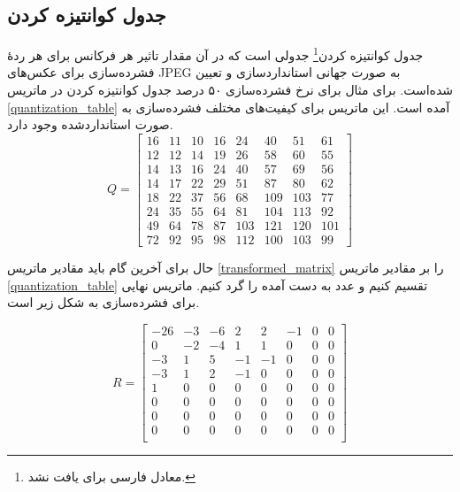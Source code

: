 \subsection{جدول کوانتیزه کردن}
جدول کوانتیزه کردن\footnote{معادل فارسی برای 
 یافت نشد.}
جدولی است که در آن مقدار تاثیر هر فرکانس برای هر ردهٔ فشرده‌سازی 
برای عکس‌های JPEG به صورت جهانی استانداردسازی و تعیین شده‌است. 
برای مثال برای نرخ فشرده‌سازی ۵۰ درصد 
جدول کوانتیزه کردن در ماتریس 
\ref{quantization_table}
آمده است. این ماتریس برای کیفیت‌های مختلف فشرده‌سازی به صورت استانداردشده وجود دارد.
\begin{equation}      
        Q = \begin{bmatrix}
                16 & 11 & 10 & 16 & 24 & 40 & 51 & 61\\
                12 & 12 & 14 & 19 & 26 & 58 & 60 & 55 \\
                14 & 13 & 16 & 24 & 40 & 57 & 69 & 56 \\
                14 & 17 & 22 & 29 & 51 & 87 & 80 & 62 \\
                18 & 22 & 37 & 56 & 68 & 109 & 103 & 77 \\
                24 & 35 & 55 & 64 & 81 & 104 & 113 & 92 \\
                49 & 64 & 78 & 87 & 103 & 121 & 120 & 101 \\
                72 & 92 & 95 & 98 & 112 & 100 & 103 & 99 

        \end{bmatrix}
        \label{quantization_table}
\end{equation}

حال برای آخرین گام باید مقادیر ماتریس
\ref{transformed_matrix}
را بر مقادیر ماتریس 
\ref{quantization_table}
تقسیم کنیم و عدد به دست آمده را گرد کنیم. ماتریس نهایی برای فشرده‌سازی به شکل زیر است.

\begin{equation}
       R = \begin{bmatrix}
                -26 & -3 & -6 & 2 & 2 & -1 & 0 & 0\\
                0 & -2 & -4 & 1 & 1 & 0 & 0 & 0 \\
                -3 & 1 & 5 & -1 & -1 & 0 & 0 & 0 \\
                -3 & 1 & 2 & -1 & 0 & 0 & 0 & 0 \\
                1 & 0 & 0 & 0 & 0 & 0 & 0 & 0 \\
                0 & 0 & 0 & 0 & 0 & 0 & 0 & 0 \\
                0 & 0 & 0 & 0 & 0 & 0 & 0 & 0 \\
                0 & 0 & 0 & 0 & 0 & 0 & 0 & 0 \\

        \end{bmatrix}
        \label{last_matrix}
\end{equation}

